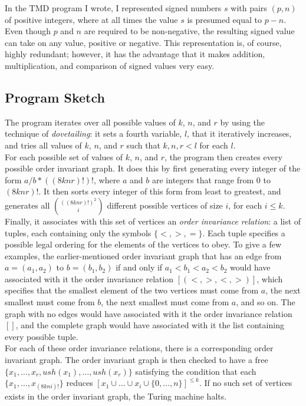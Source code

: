 \documentclass[11pt]{report}
\begin{document}
In the TMD program I wrote, I represented signed numbers $s$ with pairs $(p, n)$ of positive integers, where at all times the value $s$ is presumed equal to $p - n$. Even though $p$ and $n$ are required to be non-negative, the resulting signed value can take on any value, positive or negative. This representation is, of course, highly redundant; however, it has the advantage that it makes addition, multiplication, and comparison of signed values very easy.

\subsection{Program Sketch}

The program iterates over all possible values of $k$, $n$, and $r$ by using the technique of \emph{dovetailing}: it sets a fourth variable, $l$, that it iteratively increases, and tries all values of $k$, $n$, and $r$ such that $k, n, r < l$ for each $l$. \\

For each possible set of values of $k$, $n$, and $r$, the program then creates every possible order invariant graph. It does this by first generating every integer of the form $a / b * ((8knr)!)!$, where $a$ and $b$ are integers that range from 0 to $(8knr)!$. It then sorts every integer of this form from least to greatest, and generates all ${((8knr)!)^2 \choose i}$ different possible vertices of size $i$, for each $i \le k$. Finally, it associates with this set of vertices an \emph{order invariance relation}: a list of tuples, each containing only the symbols $\{<, >, =\}$. Each tuple specifies a possible legal ordering for the elements of the vertices to obey. To give a few examples, the earlier-mentioned order invariant graph that has an edge from $a = (a_1, a_2)$ to $b = (b_1, b_2)$ if and only if $a_1 < b_1 < a_2 < b_2$ would have associated with it the order invariance relation $[(<, >, <, >)]$, which specifies that the smallest element of the two vertices must come from $a$, the next smallest must come from $b$, the next smallest must come from $a$, and so on. The graph with no edges would have associated with it the order invariance relation $[]$, and the complete graph would have associated with it the list containing every possible tuple. \\

For each of these order invariance relations, there is a corresponding order invariant graph. The order invariant graph is then checked to have a free $\{x_1,\dots,x_r, ush(x_1),...,ush(x_r)\}$ satisfying the condition that each $\{x_1, \dots, x_{(8kni)!}\}$ reduces $[x_1 \cup \dots \cup x_i \cup \{0,\dots,n\}]^{\le k}$. If no such set of vertices exists in the order invariant graph, the Turing machine halts. \\
\end{document}
